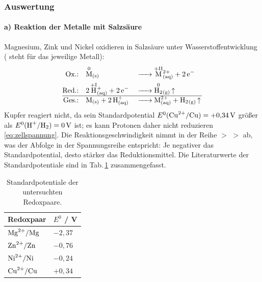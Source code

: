 \subsubsection{Auswertung}
\paragraph{a) Reaktion der Metalle mit Salzsäure}
Magnesium, Zink und Nickel oxidieren in Salzsäure unter Wasserstoffentwicklung ( steht für das jeweilige Metall):
\begin{align}
    \text{Ox.:}\quad  & \ce{\overset{\mathrm{0}}{\ce{M}}_{(s)}}               &  & \ce{-> \overset{\mathrm{+II}}{\ce{M}}^{2+}_{(aq)} + 2 e^-} \\
    \text{Red.:}\quad & \ce{2 \overset{\mathrm{+I}}{\ce{H}}^+_{(aq)} + 2 e^-} &  & \ce{-> \overset{\mathrm{0}}{\ce{H2}}_{(g)} ^}              \\
    \hline
    \text{Ges.:}\quad & \ce{M_{(s)} + 2 H^+_{(aq)}}                           &  & \ce{-> M^{2+}_{(aq)} + H2_{(g)} ^}
\end{align}
Kupfer reagiert nicht, da sein Standardpotential $E^0(\ce{Cu^{2+}/Cu}) = +0{,}34\,\si{V}$ größer als $E^0(\ce{H^+/H2}) = 0\,\si{V}$ ist; es kann Protonen daher nicht reduzieren \eqref{eq:zellspannung}.\cite{holleman_wiberg}
Die Reaktionsgeschwindigkeit nimmt in der Reihe  $>$  $>$  ab, was der Abfolge in der Spannungsreihe entspricht: Je negativer das Standardpotential, desto stärker das Reduktionsmittel.
Die Literaturwerte der Standardpotentiale sind in Tab.\,\ref{tab:stdpot} zusammengefasst.\cite{holleman_wiberg}

\begin{table}[H]
    \centering
    \caption{Standardpotentiale der untersuchten Redoxpaare.\cite{holleman_wiberg}}
    \label{tab:stdpot}
    \begin{tabular}{ll}
        \toprule
        Redoxpaar         & $E^0$ / V \\
        \midrule
        $\ce{Mg^{2+}/Mg}$ & $-2{,}37$ \\
        $\ce{Zn^{2+}/Zn}$ & $-0{,}76$ \\
        $\ce{Ni^{2+}/Ni}$ & $-0{,}24$ \\
        $\ce{Cu^{2+}/Cu}$ & $+0{,}34$ \\
        \bottomrule
    \end{tabular}
\end{table}


